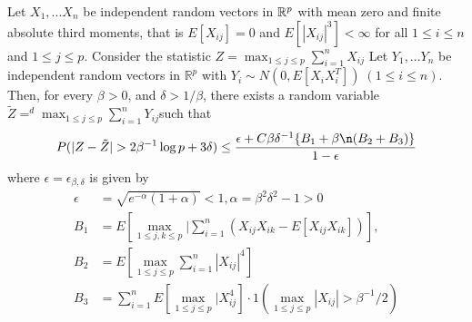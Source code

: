 \documentclass{article}
\begin{document}
\begin{lemma}
    \label{lem:refinedcoup}
    Let $X_1, ... X_n $ be independent random vectors in $\mathbb{R}^p$ with mean zero and finite absolute third moments, that is $E[X_{ij}] = 0 $ and $E[ | X_{ij}|^3] < \infty $ for all $ 1 \leq i \leq n $ and $1 \leq j \leq p $. Consider the statistic $Z = \max _ { 1 \leq j \leq p} \sum_{i=1}^n X_{ij} $ Let 
    $Y_1, ... Y_n$ be independent random vectors in $\mathbb{R}^p$ with $Y_i \sim N(0, E[ X_i X_i ^T ])\;(1 \leq i \leq n)$. Then, for every $\beta >0$, and $ \delta > 1/ \beta $, there exists a random variable $ \tilde{Z} =^d \max_{ 1 \leq j \leq p }  \sum_{i=1}^ n Y_{ij} $such that 
    \begin{equation}
        P( | Z  - \tilde{Z} | > 2 \beta ^{-1} \log p + 3 \delta ) \leq \frac{ \epsilon + C \beta \delta^{-1}\{ B_1 + \beta \n ( B_2 + B_3)\} } { 1 - \epsilon}\\
    \end{equation}
    where $\epsilon = \epsilon_{\beta, \delta}$ is given by 
    \begin{align}
        \epsilon &= \sqrt{e^{-\alpha}( 1+ \alpha) } < 1  , \alpha = \beta^2 \delta^2 -1 >0 \\
        B_1 &= E [ \max_{ 1 \leq j,k \leq p}| \sum_{i=1}^n(X_{ij}X_{ik} - E[ X_{ij}X_{ik}])], \\
        B_2 &= E[ \max_ { 1 \leq j \leq p} \sum_{i=1}^n | X_{ij}|^4]\\
        B_3 &= \sum_{i=1}^n E[ \max_{ 1 \leq j \leq p} | X_{ij}^4] \cdot 1( \max_{1 \leq j \leq p } | X_{ij}| > \beta^{-1}/2)
    \end{align}
\end{lemma} 
\end{document}

